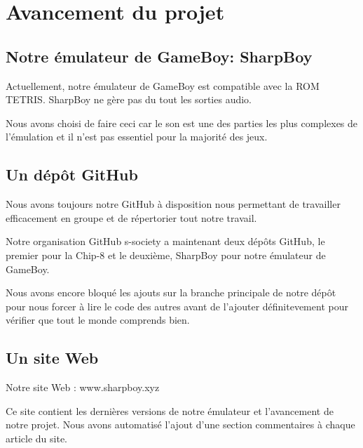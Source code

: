 \documentclass[12pt, a4paper]{article}
\begin{document}
\section{Avancement du projet}

\subsection{Notre émulateur de GameBoy: SharpBoy}
Actuellement, notre émulateur de GameBoy est compatible avec la ROM TETRIS. SharpBoy ne gère pas du tout les sorties audio.

Nous avons choisi de faire ceci car le son est une des parties les plus complexes de l'émulation et il n'est pas essentiel pour la majorité des jeux.

\subsection{\large Un dépôt GitHub }

Nous avons toujours notre GitHub à disposition nous permettant de travailler efficacement en groupe et de répertorier tout notre travail.

Notre organisation GitHub s-society a maintenant deux dépôts GitHub, le premier pour la Chip-8 et le deuxième, SharpBoy pour notre émulateur de GameBoy.

Nous avons encore bloqué les ajouts sur la branche principale de notre dépôt pour nous forcer à lire le code des autres avant de l'ajouter définitevement pour vérifier que tout le monde comprends bien.


\subsection{Un site Web}

Notre site Web : www.sharpboy.xyz

Ce site contient les dernières versions de notre émulateur et l'avancement de notre projet. Nous avons automatisé l'ajout d'une section commentaires à chaque article du site.

\bigskip
\end{document}
